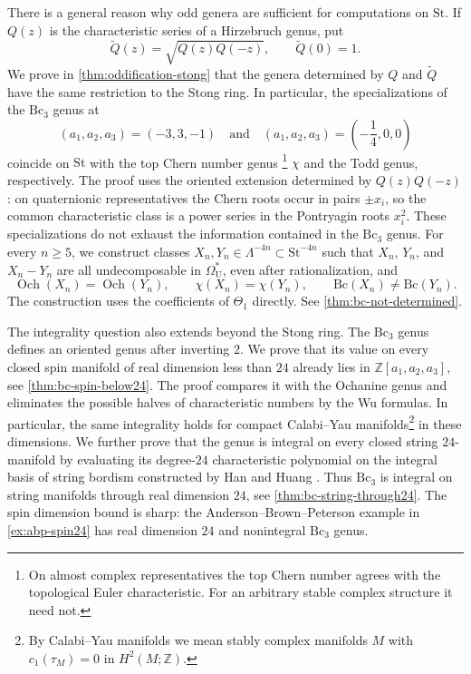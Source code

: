 \documentclass[14pt,dvipsnames]{extarticle}
\numberwithin{equation}{subsection}
\theoremstyle{plain}
\theoremstyle{definition}
\theoremstyle{definition}
\DeclareMathOperator{\Och}{Och}
\newcommand{\OmU}{\Omega_{\mathrm U}^{\ast}}
\newcommand{\Bc}{\mathrm{Bc}}
\newcommand{\St}{\mathrm{St}}
\begin{document}
There is a general reason why odd genera are sufficient for computations on
\(\St\). If \(Q(z)\) is the characteristic series of a Hirzebruch genus, put
\[
 \widetilde Q(z)=\sqrt{Q(z)Q(-z)},
 \qquad \widetilde Q(0)=1.
\]
We prove in \cref{thm:oddification-stong} that the genera determined by
\(Q\) and \(\widetilde Q\) have the same restriction to the Stong ring. In
particular, the specializations of the $\Bc_3$ genus at
\[
 (a_1,a_2,a_3)=(-3,3,-1)
 \quad\text{and}\quad
 (a_1,a_2,a_3)=\left(-\frac14,0,0\right)
\]
coincide on \(\St\) with the top Chern number genus \footnote{On almost
complex representatives the top Chern number agrees with the topological
Euler characteristic. For an arbitrary stable complex structure it need not.}
$\chi$ and the Todd genus,
respectively. The proof uses the oriented extension determined by
$Q(z)Q(-z)$: on quaternionic representatives the Chern roots occur in pairs
$\pm x_i$, so the common characteristic class is a power series in the
Pontryagin roots $x_i^2$. These specializations do not exhaust the information
contained in the $\Bc_3$ genus. For every $n\geq5$, we construct classes
$X_n,Y_n\in\Lambda^{-4n}\subset\St^{-4n}$ such that $X_n$, $Y_n$, and
$X_n-Y_n$ are all undecomposable in $\OmU$, even after rationalization, and
\[
 \Och(X_n)=\Och(Y_n),\qquad \chi(X_n)=\chi(Y_n),
 \qquad \Bc(X_n)\ne\Bc(Y_n).
\]
The construction uses the coefficients of $\Theta_1$ directly. See
\cref{thm:bc-not-determined}.

The integrality question also extends beyond the Stong ring. The $\Bc_3$
genus defines an oriented genus after inverting $2$. We prove that its value
on every closed spin manifold of real dimension less than $24$ already lies
in $\mathbb Z[a_1,a_2,a_3]$, see \cref{thm:bc-spin-below24}. The proof compares
it with the Ochanine genus and eliminates the possible halves of
characteristic numbers by the Wu formulas. In particular, the same
integrality holds for compact Calabi--Yau manifolds\footnote{By Calabi--Yau manifolds we mean stably complex manifolds $M$ with $c_1(\tau_M) = 0$ in $H^2(M;\mathbb Z)$.} in these dimensions.
We further prove that the genus is integral on every closed string
$24$-manifold by evaluating its degree-$24$ characteristic polynomial on the
integral basis of string bordism constructed by Han and Huang
\cite[Theorem~1 and Corollary~3]{HH22String}. Thus $\Bc_3$ is integral on
string manifolds through real dimension $24$, see
\cref{thm:bc-string-through24}. The spin dimension bound is sharp: the
Anderson--Brown--Peterson example in \cref{ex:abp-spin24} has real dimension
$24$ and nonintegral $\Bc_3$ genus.
\end{document}

